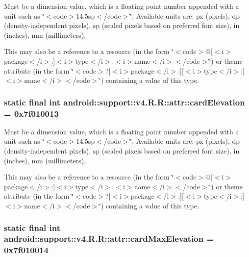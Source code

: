 Must be a dimension value, which is a floating point number appended with a unit such as \char`\"{}$<$code$>$14.5sp$<$/code$>$\char`\"{}. Available units are: px (pixels), dp (density-independent pixels), sp (scaled pixels based on preferred font size), in (inches), mm (millimeters). 

This may also be a reference to a resource (in the form \char`\"{}$<$code$>$@\mbox{[}$<$i$>$package$<$/i$>$:\mbox{]}$<$i$>$type$<$/i$>$:$<$i$>$name$<$/i$>$$<$/code$>$\char`\"{}) or theme attribute (in the form \char`\"{}$<$code$>$?\mbox{[}$<$i$>$package$<$/i$>$:\mbox{]}\mbox{[}$<$i$>$type$<$/i$>$:\mbox{]}$<$i$>$name$<$/i$>$$<$/code$>$\char`\"{}) containing a value of this type. \hypertarget{classandroid_1_1support_1_1v4_1_1_r_1_1attr_73740d3d5c8225b693120a59eba435be}{
\subsubsection[{cardElevation}]{\setlength{\rightskip}{0pt plus 5cm}static final int android::support::v4.R.R::attr::cardElevation = 0x7f010013}}
\label{classandroid_1_1support_1_1v4_1_1_r_1_1attr_73740d3d5c8225b693120a59eba435be}


Must be a dimension value, which is a floating point number appended with a unit such as \char`\"{}$<$code$>$14.5sp$<$/code$>$\char`\"{}. Available units are: px (pixels), dp (density-independent pixels), sp (scaled pixels based on preferred font size), in (inches), mm (millimeters). 

This may also be a reference to a resource (in the form \char`\"{}$<$code$>$@\mbox{[}$<$i$>$package$<$/i$>$:\mbox{]}$<$i$>$type$<$/i$>$:$<$i$>$name$<$/i$>$$<$/code$>$\char`\"{}) or theme attribute (in the form \char`\"{}$<$code$>$?\mbox{[}$<$i$>$package$<$/i$>$:\mbox{]}\mbox{[}$<$i$>$type$<$/i$>$:\mbox{]}$<$i$>$name$<$/i$>$$<$/code$>$\char`\"{}) containing a value of this type. \hypertarget{classandroid_1_1support_1_1v4_1_1_r_1_1attr_0419af13f5fd8dbc1c846e1667b52a91}{
\subsubsection[{cardMaxElevation}]{\setlength{\rightskip}{0pt plus 5cm}static final int android::support::v4.R.R::attr::cardMaxElevation = 0x7f010014}}
\label{classandroid_1_1support_1_1v4_1_1_r_1_1attr_0419af13f5fd8dbc1c846e1667b52a91}


